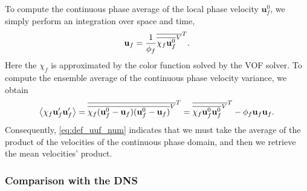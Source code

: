 To compute the continuous phase average of the local phase velocity $\textbf{u}_f^0$, we simply perform an integration over space and time, 
\begin{equation*}
    \textbf{u}_f = \frac{1}{\phi_f} \overline{\overline{\chi_f \textbf{u}_f^0}^V}^T. 
\end{equation*}
Here the $\chi_f$ is approximated by the color function solved by the VOF solver. 
To compute the ensemble average of the continuous phase velocity variance, we obtain
\begin{equation}
    \avg{\chi_f\textbf{u}_f' \textbf{u}_f'}
    = \Tavg{\Xavg{\chi_f (\textbf{u}_f^0 -\textbf{u}_f ) (\textbf{u}_f^0 -\textbf{u}_f)}}
    = \Tavg{\Xavg{\chi_f \textbf{u}_f^0 \textbf{u}_f^0}}
    -  \phi_f  \textbf{u}_f \textbf{u}_f.
    \label{eq:def_uuf_num} 
\end{equation}
Consequently, \ref{eq:def_uuf_num} indicates that we must take the average of the product of the velocities of the continuous phase domain, and then we retrieve the mean velocities' product.  




\subsubsection{Comparison with the DNS}

